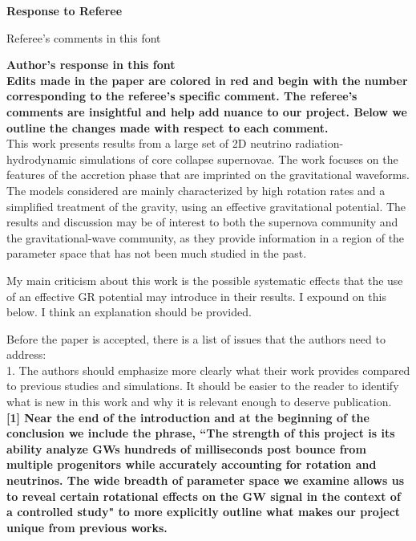 \documentclass[11pt]{article}
\begin{document}
\setcounter{page}{1}  \renewcommand{\thepage}
           {\arabic{page}}%

\begin{center}
{\bf Response to Referee} \vspace{-0.2in}
\end{center}

Referee's comments in this font

\textbf{Author's response in this font}\\

\textbf{Edits made in the paper are colored in red and begin with the number corresponding to the referee's specific comment.  The referee's comments are insightful and help add nuance to our project.  Below we outline the changes made with respect to each comment.}\\

This work presents results from a large set of 2D neutrino radiation-hydrodynamic simulations of core collapse supernovae. The work focuses on the features of the accretion phase that are imprinted on the gravitational waveforms. The models considered are mainly characterized by high rotation rates and a simplified treatment of the gravity, using an effective gravitational potential. The results and discussion may be of interest to both the supernova community and the gravitational-wave community, as they provide information in a region of the parameter space that has not been much studied in the past.

My main criticism about this work is the possible systematic effects that the 
use of an effective GR potential may introduce in their results. I expound on
this below. I think an explanation should be provided.

Before the paper is accepted, there is a list of issues that the authors need to 
address:\\

1. The authors should emphasize more clearly what their work provides compared to previous studies and simulations. It should be easier to the reader to identify what is new in this work and why it is relevant enough to deserve publication.\\

\textbf{[1] Near the end of the introduction and at the beginning of the conclusion we include the phrase, ``The strength of this project is its ability analyze GWs hundreds of milliseconds post bounce from multiple progenitors while accurately accounting for rotation and neutrinos.  The wide breadth of parameter space we examine allows us to reveal certain rotational effects on the GW signal in the context of a controlled study" to more explicitly outline what makes our project unique from previous works.}\\
\end{document}
